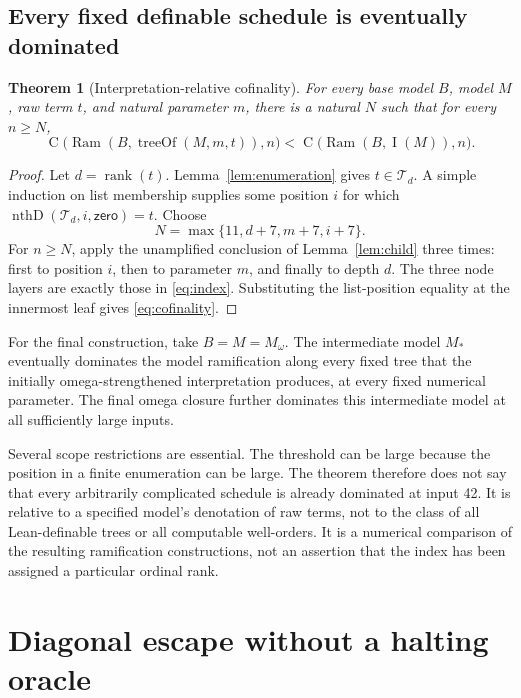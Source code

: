 \documentclass[11pt,letterpaper]{article}
\newtheorem{theorem}{Theorem}[section]
\theoremstyle{definition}
\newcommand{\rank}{\operatorname{rank}}
\newcommand{\Ram}{\operatorname{Ram}}
\newcommand{\Val}{\operatorname{C}}
\newcommand{\idx}{\operatorname{I}}
\newcommand{\td}{\operatorname{treeOf}}
\begin{document}
\subsection{Every fixed definable schedule is eventually dominated}

\begin{theorem}[Interpretation-relative cofinality]\label{thm:cofinality}
For every base model $B$, model $M$, raw term $t$, and natural parameter $m$,
there is a natural $N$ such that for every $n\ge N$,
\begin{equation}\label{eq:cofinality}
 \Val\bigl(\Ram(B,\td(M,m,t)),n\bigr)
       <\Val\bigl(\Ram(B,\idx(M)),n\bigr).
\end{equation}
\end{theorem}
\begin{proof}
Let $d=\rank(t)$. Lemma~\ref{lem:enumeration} gives
$t\in\mathcal T_d$. A simple induction on list membership supplies some
position $i$ for which
$\operatorname{nthD}(\mathcal T_d,i,\mathsf{zero})=t$.
Choose
\begin{equation}\label{eq:threshold}
                N=\max\{11,d+7,m+7,i+7\}.
\end{equation}
For $n\ge N$, apply the unamplified conclusion of
Lemma~\ref{lem:child} three times: first to position $i$, then to parameter
$m$, and finally to depth $d$. The three node layers are exactly those in
\eqref{eq:index}. Substituting the list-position equality at the innermost
leaf gives \eqref{eq:cofinality}.
\end{proof}

For the final construction, take $B=M=M_\omega$. The intermediate model
$M_*$ eventually dominates the model ramification along every fixed tree
that the initially omega-strengthened interpretation produces, at every
fixed numerical parameter. The final omega closure further dominates this
intermediate model at all sufficiently large inputs.

Several scope restrictions are essential. The threshold can be large because
the position in a finite enumeration can be large. The theorem therefore does
not say that every arbitrarily complicated schedule is already dominated at
input 42. It is relative to a specified model's denotation of raw terms, not
to the class of all Lean-definable trees or all computable well-orders. It is
a numerical comparison of the resulting ramification constructions, not an
assertion that the index has been assigned a particular ordinal rank.

\section{Diagonal escape without a halting oracle}
\label{sec:diagonal}
\end{document}
